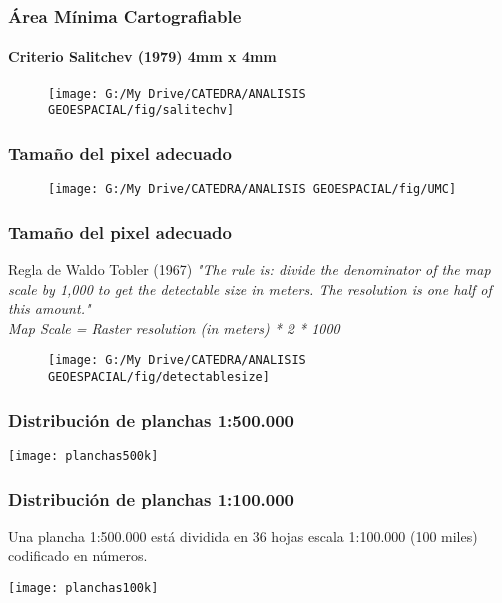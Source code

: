 \documentclass{beamer}
\begin{document}
\begin{frame}
\frametitle{Área Mínima Cartografiable}
\framesubtitle{Criterio Salitchev (1979) 4mm x 4mm}
 \begin{figure}
    \centering
    \texttt{[image: G:/My Drive/CATEDRA/ANALISIS GEOESPACIAL/fig/salitechv]}
  \end{figure}
\end{frame}
\begin{frame}
\frametitle{Tamaño del pixel adecuado}
 \begin{figure}
    \centering
    \texttt{[image: G:/My Drive/CATEDRA/ANALISIS GEOESPACIAL/fig/UMC]}
  \end{figure}
\end{frame}
\begin{frame}
\frametitle{Tamaño del pixel adecuado}
\begin{exampleblock}{Regla de Waldo Tobler (1967) }
\small{\emph{"The rule is: divide the denominator of the map scale by 1,000 to get the detectable size in meters. The resolution is one half of this amount."\\
Map Scale = Raster resolution (in meters) * 2 * 1000}}
\end{exampleblock}
 \begin{figure}
    \centering
    \texttt{[image: G:/My Drive/CATEDRA/ANALISIS GEOESPACIAL/fig/detectablesize]}
  \end{figure}
\end{frame}
\begin{frame}
\frametitle{Distribución de planchas 1:500.000}
\begin{center}
   	\texttt{[image: planchas500k]}
\end{center}
\end{frame}
\begin{frame}
\frametitle{Distribución de planchas 1:100.000}
\small{Una plancha 1:500.000 está dividida en 36 hojas escala 1:100.000 (100 miles) codificado en números.}
\begin{center}
   	\texttt{[image: planchas100k]}
\end{center}
\end{frame}
\end{document}
